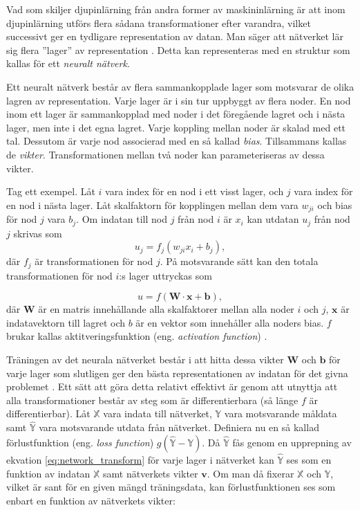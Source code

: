 Vad som skiljer djupinlärning från andra former av maskininlärning är att inom djupinlärning utförs flera sådana transformationer efter varandra, vilket successivt ger en tydligare representation av datan. Man säger att nätverket lär sig flera ''lager'' av representation \cite{Chollet}. Detta kan representeras med en struktur som kallas för ett \textit{neuralt nätverk}. 

Ett neuralt nätverk består av flera sammankopplade lager som motsvarar de olika lagren av representation. Varje lager är i sin tur uppbyggt av flera noder. En nod inom ett lager är sammankopplad med noder i det föregående lagret och i nästa lager, men inte i det egna lagret. Varje koppling mellan noder är skalad med ett tal. Dessutom är varje nod associerad med en så kallad \textit{bias}. Tillsammans kallas de \textit{vikter}. Transformationen mellan två noder kan parameteriseras av dessa vikter. 

Tag ett exempel. Låt $i$ vara index för en nod i ett visst lager, och $j$ vara index för en nod i nästa lager. Låt skalfaktorn för kopplingen mellan dem vara $w_{ji}$ och bias för nod $j$ vara $b_j$. Om indatan till nod $j$ från nod $i$ är $x_i$ kan utdatan $u_j$ från nod $j$  skrivas som
\begin{equation}
    u_j = f_j \left(w_{ji}x_i + b_j\right),
\end{equation}
där $f_j$ är transformationen för nod $j$. På motsvarande sätt kan den totala transformationen för nod $i$:s lager uttryckas som 

\begin{equation}
    u = f(\textbf{W} \cdot \textbf{x} + \textbf{b}),
    \label{eq:network_transform}
\end{equation}
där $\textbf{W}$ är en matris innehållande alla skalfaktorer mellan alla noder $i$ och $j$, $\textbf{x}$ är indatavektorn till lagret och $b$ är en vektor som innehåller alla noders bias. $f$ brukar kallas aktitveringsfunktion (eng. \emph{activation function}) \cite{Chollet}. 

Träningen av det neurala nätverket består i att hitta dessa vikter $\textbf{W}$ och $\textbf{b}$ för varje lager som slutligen ger den bästa representationen av indatan för det givna problemet \cite{Chollet}. Ett sätt att göra detta 
relativt effektivt är genom att utnyttja att alla transformationer består av steg som är differentierbara (så länge $f$ är differentierbar). Låt $\mathbb{X}$ vara indata till nätverket, $\mathbb{Y}$ vara motsvarande måldata samt $\mathbb{\hat{Y}}$ vara motsvarande utdata från nätverket. Definiera nu en så kallad förlustfunktion (eng. \emph{loss function}) $g\left(\mathbb{\hat{Y}} - \mathbb{Y} \right)$. Då $\mathbb{\hat{Y}}$ fås genom en upprepning av ekvation \eqref{eq:network_transform} för varje lager i nätverket kan $\mathbb{\hat{Y}}$ ses som en funktion av indatan $\mathbb{X}$ samt nätverkets vikter $\textbf{v}$. Om man då fixerar $\mathbb{X}$ och $\mathbb{Y}$, vilket är sant för en given mängd träningsdata, kan förlustfunktionen ses som enbart en funktion av nätverkets vikter:

